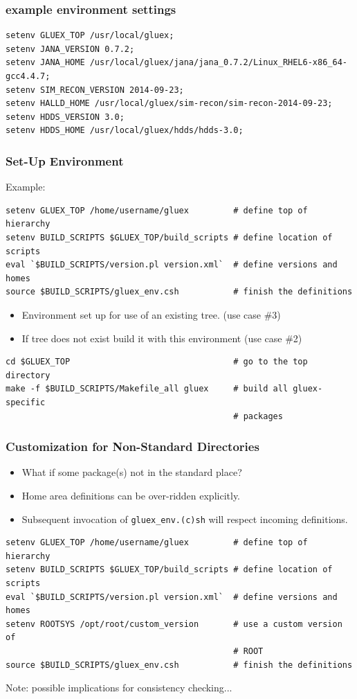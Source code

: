 \documentclass[xcolor=dvipsnames,hyperref={pdfpagelabels=false}]{beamer}
\newcommand{\bi}{\begin{itemize}}
\newcommand{\ei}{\end{itemize}}
\newcommand{\I}{\item}
\newcommand{\ft}{\frametitle}
\begin{document}
\begin{frame}[fragile]
\ft{example environment settings}
\footnotesize
\begin{verbatim}
setenv GLUEX_TOP /usr/local/gluex;
setenv JANA_VERSION 0.7.2;
setenv JANA_HOME /usr/local/gluex/jana/jana_0.7.2/Linux_RHEL6-x86_64-gcc4.4.7;
setenv SIM_RECON_VERSION 2014-09-23;
setenv HALLD_HOME /usr/local/gluex/sim-recon/sim-recon-2014-09-23;
setenv HDDS_VERSION 3.0;
setenv HDDS_HOME /usr/local/gluex/hdds/hdds-3.0;
\end{verbatim}
\end{frame}

\begin{frame}[fragile]
\ft{Set-Up Environment}
Example:
{\footnotesize
\begin{verbatim}
setenv GLUEX_TOP /home/username/gluex         # define top of hierarchy
setenv BUILD_SCRIPTS $GLUEX_TOP/build_scripts # define location of scripts
eval `$BUILD_SCRIPTS/version.pl version.xml`  # define versions and homes
source $BUILD_SCRIPTS/gluex_env.csh           # finish the definitions
\end{verbatim}
}
\bi
\I Environment set up for use of an existing tree. (use case \#3)
\I If tree does not exist build it with this environment (use case \#2)
\ei
{\footnotesize
\begin{verbatim}
cd $GLUEX_TOP                                 # go to the top directory
make -f $BUILD_SCRIPTS/Makefile_all gluex     # build all gluex-specific
                                              # packages
\end{verbatim}
}
\end{frame}

\begin{frame}[fragile]
\ft{Customization for Non-Standard Directories}
\bi
\I What if some package(s) not in the standard place?
\I Home area definitions can be over-ridden explicitly.
\I Subsequent invocation of {\tt gluex\_env.(c)sh} will respect incoming definitions.
\ei
{\footnotesize
\begin{verbatim}
setenv GLUEX_TOP /home/username/gluex         # define top of hierarchy
setenv BUILD_SCRIPTS $GLUEX_TOP/build_scripts # define location of scripts
eval `$BUILD_SCRIPTS/version.pl version.xml`  # define versions and homes
setenv ROOTSYS /opt/root/custom_version       # use a custom version of
                                              # ROOT
source $BUILD_SCRIPTS/gluex_env.csh           # finish the definitions
\end{verbatim}
Note: possible implications for consistency checking...
}
\end{frame}
\end{document}

